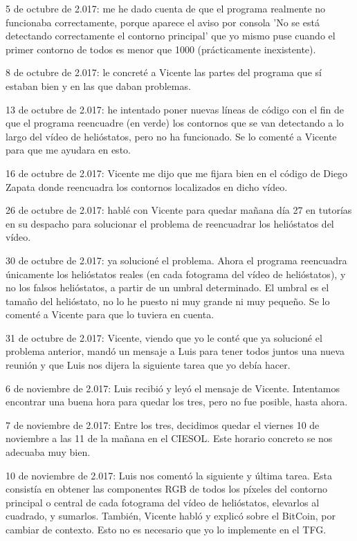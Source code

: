 5 de octubre de 2.017: me he dado cuenta de que el programa realmente no funcionaba correctamente, porque aparece el aviso por consola 'No se está detectando correctamente el contorno principal' que yo mismo puse cuando el primer contorno de todos es menor que 1000 (prácticamente inexistente).

8 de octubre de 2.017: le concreté a Vicente las partes del programa que sí estaban bien y en las que daban problemas.

13 de octubre de 2.017: he intentado poner nuevas líneas de código con el fin de que el programa reencuadre (en verde) los contornos que se van detectando a lo largo del vídeo de helióstatos, pero no ha funcionado. Se lo comenté a Vicente para que me ayudara en esto.

16 de octubre de 2.017: Vicente me dijo que me fijara bien en el código de Diego Zapata donde reencuadra los contornos localizados en dicho vídeo.

26 de octubre de 2.017: hablé con Vicente para quedar mañana día 27 en tutorías en su despacho para solucionar el problema de reencuadrar los helióstatos del vídeo.

30 de octubre de 2.017: ya solucioné el problema. Ahora el programa reencuadra únicamente los helióstatos reales (en cada fotograma del vídeo de helióstatos), y no los falsos helióstatos, a partir de un umbral determinado. El umbral es el tamaño del helióstato, no lo he puesto ni muy grande ni muy pequeño. Se lo comenté a Vicente para que lo tuviera en cuenta.

31 de octubre de 2.017: Vicente, viendo que yo le conté que ya solucioné el problema anterior, mandó un mensaje a Luis para tener todos juntos una nueva reunión y que Luis nos dijera la siguiente tarea que yo debía hacer.

6 de noviembre de 2.017: Luis recibió y leyó el mensaje de Vicente. Intentamos encontrar una buena hora para quedar los tres, pero no fue posible, hasta ahora.

7 de noviembre de 2.017: Entre los tres, decidimos quedar el viernes 10 de noviembre a las 11 de la mañana en el CIESOL. Este horario concreto se nos adecuaba muy bien.

10 de noviembre de 2.017: Luis nos comentó la siguiente y última tarea. Esta consistía en obtener las componentes RGB de todos los píxeles del contorno principal o central de cada fotograma del vídeo de helióstatos, elevarlos al cuadrado, y sumarlos. También, Vicente habló y explicó sobre el BitCoin, por cambiar de contexto. Esto no es necesario que yo lo implemente en el TFG.

